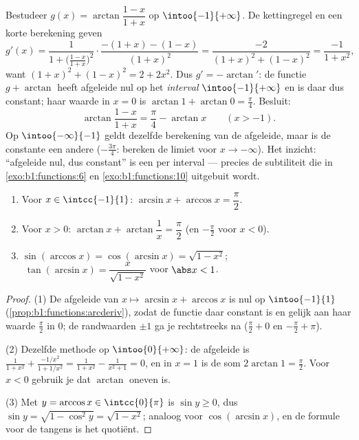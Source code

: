 \begin{example}\label{ex:b1:functions:hiddenconst}
Bestudeer $g(x) = \arctan\dfrac{1 - x}{1 + x}$ op $\intoo{-1}
{+\infty}$. De kettingregel en een korte berekening geven
\[
g'(x) = \frac{1}{1 + \bigl(\frac{1-x}{1+x}\bigr)^2}\cdot
\frac{-(1+x) - (1-x)}{(1+x)^2}
= \frac{-2}{(1+x)^2 + (1-x)^2}
= \frac{-1}{1 + x^2} ,
\]
want $(1+x)^2 + (1-x)^2 = 2 + 2x^2$. Dus $g' = -\arctan'$: de functie
$g + \arctan$ heeft afgeleide nul op het \emph{interval}
$\intoo{-1}{+\infty}$ en is daar dus constant; haar waarde in $x = 0$ is
$\arctan 1 + \arctan 0 = \frac\pi4$. Besluit:
\[
\arctan\frac{1 - x}{1 + x} = \frac\pi4 - \arctan x
\qquad (x > -1) .
\]
Op $\intoo{-\infty}{-1}$ geldt dezelfde berekening van de afgeleide,
maar is de constante een andere ($-\frac{3\pi}4$: bereken de limiet
voor $x \to -\infty$). Het inzicht: ``afgeleide nul, dus constant'' is
een  per interval --- precies de subtiliteit die in
\cref{exo:b1:functions:6} en \cref{exo:b1:functions:10} uitgebuit
wordt.
\end{example}

\begin{proposition}[Standaardidentiteiten]\label{prop:b1:functions:arcidentities}
\begin{enumerate}
  \item Voor $x \in \intcc{-1}{1}$: $\arcsin x + \arccos x =
        \dfrac{\pi}{2}$.
  \item Voor $x > 0$: $\arctan x + \arctan\dfrac 1x = \dfrac{\pi}{2}$
        (en $-\frac\pi2$ voor $x < 0$).
  \item $\sin(\arccos x) = \cos(\arcsin x) = \sqrt{1 - x^2}$;
        $\;\tan(\arcsin x) = \dfrac{x}{\sqrt{1 - x^2}}$ voor
        $\abs x < 1$.
\end{enumerate}
\end{proposition}

\begin{proof}
(1) De afgeleide van $x \mapsto \arcsin x + \arccos x$ is nul op
$\intoo{-1}{1}$ (\cref{prop:b1:functions:arcderiv}), zodat de functie
daar constant is en gelijk aan haar waarde $\frac\pi2$ in $0$; de
randwaarden $\pm 1$ ga je rechtstreeks na ($\frac\pi2 + 0$ en
$-\frac\pi2 + \pi$).

(2) Dezelfde methode op $\intoo{0}{+\infty}$: de afgeleide is
$\frac{1}{1+x^2} + \frac{-1/x^2}{1 + 1/x^2} = \frac{1}{1+x^2} -
\frac{1}{x^2 + 1} = 0$, en in $x = 1$ is de som $2\arctan 1 =
\frac\pi2$. Voor $x < 0$ gebruik je dat $\arctan$ oneven is.

(3) Met $y = \arccos x \in \intcc{0}{\pi}$ is $\sin y \geq 0$, dus $\sin
y = \sqrt{1 - \cos^2 y} = \sqrt{1 - x^2}$; analoog voor $\cos(\arcsin
x)$, en de formule voor de tangens is het quotiënt.
\end{proof}

